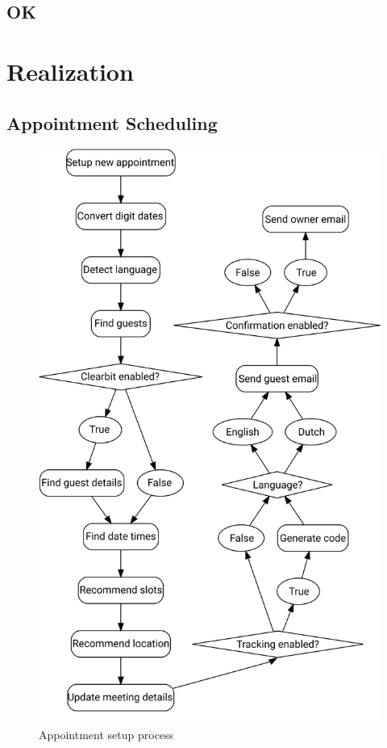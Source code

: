 \documentclass{article}
\begin{document}
\subsection{OK}

\newpage

\section{Realization}

\subsection{Appointment Scheduling}

\begin{figure}\centering
	\includegraphics[scale=0.4]{schedule-process.png}
	\caption{Appointment setup process}
\end{figure}
\end{document}
